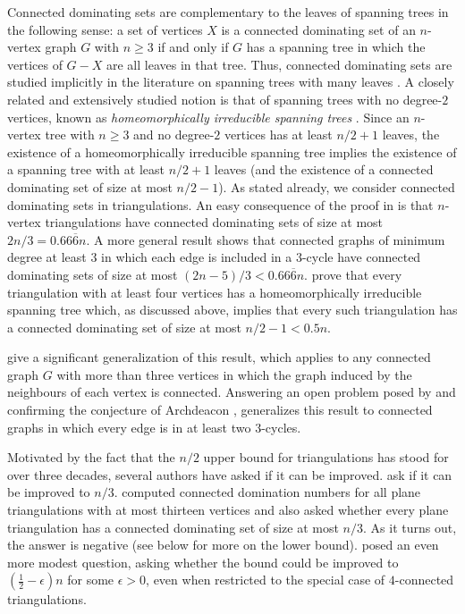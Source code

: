 \documentclass{patmorin}
\begin{document}
Connected dominating sets are complementary to the leaves of spanning trees in the following sense: a set of vertices $X$ is a connected dominating set of an $n$-vertex graph $G$ with $n\ge3$ if and only if $G$ has a spanning tree in which the vertices of $G-X$ are all leaves in that tree. Thus, connected dominating sets are studied implicitly in the literature on spanning trees with many leaves \cite{DBLP:journals/jgt/DingJS01, kleitman.west:spanning, doi:10.1137/100801251,doi:10.1137/060664318, DBLP:conf/esa/BousquetI0MOSW20, noguchi.zamfirescu:spanning}. A closely related and extensively studied notion is that of spanning trees with no degree-$2$ vertices, known as \emph{homeomorphically irreducible spanning trees} \cite{chen.ren.ea:homeomorphically,albertson.berman.ea:graphs,CHEN2013409, DBLP:journals/jgt/ItoT22, DBLP:journals/jgt/Hoffmann-Ostenhof18a, gessel2023good}.  Since an $n$-vertex tree with $n\ge3$ and no degree-$2$ vertices has at least $n/2+1$ leaves, the existence of a homeomorphically irreducible spanning tree implies the existence of a spanning tree with at least $n/2+1$ leaves (and the existence of a connected dominating set of size at most $n/2-1$). 
As stated already, we consider connected dominating sets in triangulations.  An easy consequence of the proof in \cite{matheson.tarjan:dominating} is that $n$-vertex triangulations have connected dominating sets of size at most $2n/3=0.66\overline{6}n$.  A more general result \cite{kleitman.west:spanning} shows that connected graphs of minimum degree at least $3$ in which each edge is included in a $3$-cycle have connected dominating sets of size at most $(2n-5)/3<0.66\overline{6}n$. \citet{albertson.berman.ea:graphs} prove that every triangulation with at least four vertices has a homeomorphically irreducible spanning tree which, as discussed above, implies that every such triangulation has a connected dominating set of size at most $n/2-1<0.5n$.

\citet{chen.ren.ea:homeomorphically} give a significant generalization of this result, which applies to any connected graph $G$ with more than three vertices in which the graph induced by the neighbours of each vertex is connected.
Answering an open problem posed by \citet{albertson.berman.ea:graphs} and confirming the conjecture of Archdeacon \cite{Gross_Tucker_2009}, \citet{CHEN2013409} generalizes this result to connected graphs in which every edge is in at least two $3$-cycles.

Motivated by the fact that the $n/2$ upper bound for triangulations has stood for over three decades, several authors have asked if it can be improved. \citet[Question~4.2]{bradshaw.masarik.ea:robust} ask if it can be improved to $n/3$. \citet{bryant.pavelescu:connected} computed connected domination numbers for all plane triangulations with at most thirteen vertices and also asked whether every plane triangulation has a connected dominating set of size at most $n/3$. As it turns out, the answer is negative (see below for more on the lower bound).  \citet{noguchi.zamfirescu:spanning} posed an even more modest question, asking whether the bound could be improved to $(\tfrac{1}{2}-\epsilon)n$ for some $\epsilon>0$, even when restricted to the special case of $4$-connected triangulations.
\end{document}
